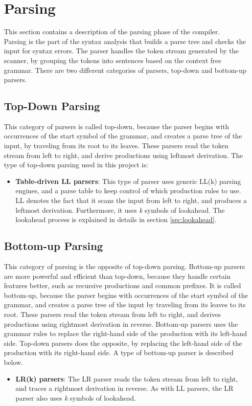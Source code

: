 \section{Parsing}
This section contains a description of the parsing phase of the compiler. 
\\Parsing is the part of the syntax analysis that builds a parse tree and checks the input for syntax errors. The parser handles the token stream generated by the scanner, by grouping the tokens into sentences based on the context free grammar. There are two different categories of parsers, top-down and bottom-up parsers.

\subsection{Top-Down Parsing}
This category of parsers is called top-down, because the parser begins with occurrences of the start symbol of the grammar, and creates a parse tree of the input, by traveling from its root to its leaves. These parsers read the token stream from left to right, and derive productions using leftmost derivation. \cite{compiler:CAC} The type of top-down parsing used in this project is:

\begin{itemize}
\item \textbf{Table-driven LL parsers}: This type of parser uses generic LL(k) parsing engines, and a parse table to keep control of which production rules to use. LL denotes the fact that it scans the input from left to right, and produces a leftmost derivation. Furthermore, it uses \textit{k} symbols of lookahead. The lookahead process is explained in details in section \ref{sec:lookahead}.
\end{itemize}

\subsection{Bottom-up Parsing}
This category of parsing is the opposite of top-down parsing. Bottom-up parsers are more powerful and efficient than top-down, because they handle certain features better, such as recursive productions and common prefixes. It is called bottom-up, because the parser begins with occurrences of the start symbol of the grammar, and creates a parse tree of the input by traveling from its leaves to its root. These parsers read the token stream from left to right, and derives productions using rightmost derivation in reverse. Bottom-up parsers uses the grammar rules to replace the right-hand side of the production with its left-hand side. Top-down parsers does the opposite, by replacing the left-hand side of the production with its right-hand side. \cite{compiler:CAC} A type of bottom-up parser is described below. 

\begin{itemize}
\item \textbf{LR(k) parsers}: The LR parser reads the token stream from left to right, and traces a rightmost derivation in reverse. As with LL parsers, the LR parser also uses \textit{k} symbols of lookahead.  
\end{itemize}
